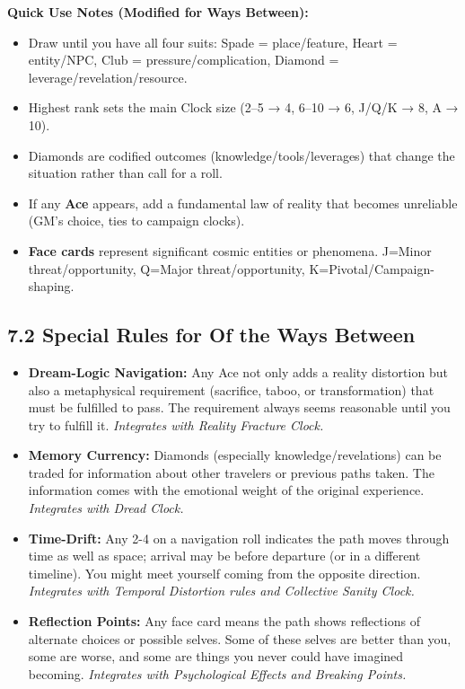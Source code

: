 \documentclass[11pt]{article}
\begin{document}
\textbf{Quick Use Notes (Modified for Ways Between):}
\begin{itemize}
\item Draw until you have all four suits: Spade = place/feature, Heart = entity/NPC, Club = pressure/complication, Diamond = leverage/revelation/resource.
\item Highest rank sets the main Clock size (2--5 → 4, 6--10 → 6, J/Q/K → 8, A → 10).
\item Diamonds are codified outcomes (knowledge/tools/leverages) that change the situation rather than call for a roll.
\item If any \textbf{Ace} appears, add a fundamental law of reality that becomes unreliable (GM's choice, ties to campaign clocks).
\item \textbf{Face cards} represent significant cosmic entities or phenomena. J=Minor threat/opportunity, Q=Major threat/opportunity, K=Pivotal/Campaign-shaping.
\end{itemize}

\clearpage

\subsection*{7.2 Special Rules for Of the Ways Between}

\begin{itemize}
\item \textbf{Dream-Logic Navigation:} Any Ace not only adds a reality distortion but also a metaphysical requirement (sacrifice, taboo, or transformation) that must be fulfilled to pass. The requirement always seems reasonable until you try to fulfill it. \textit{Integrates with Reality Fracture Clock.}
\item \textbf{Memory Currency:} Diamonds (especially knowledge/revelations) can be traded for information about other travelers or previous paths taken. The information comes with the emotional weight of the original experience. \textit{Integrates with Dread Clock.}
\item \textbf{Time-Drift:} Any 2-4 on a navigation roll indicates the path moves through time as well as space; arrival may be before departure (or in a different timeline). You might meet yourself coming from the opposite direction. \textit{Integrates with Temporal Distortion rules and Collective Sanity Clock.}
\item \textbf{Reflection Points:} Any face card means the path shows reflections of alternate choices or possible selves. Some of these selves are better than you, some are worse, and some are things you never could have imagined becoming. \textit{Integrates with Psychological Effects and Breaking Points.}
\end{itemize}
\end{document}
